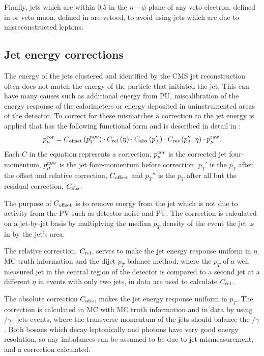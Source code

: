 Finally, jets which are within 0.5 in the $\eta-\phi$ plane of any veto electron, defined in  or veto muon, defined in  are vetoed, to avoid using jets which are due to misreconstructed leptons.

\subsection{Jet energy corrections}
\label{sec:jec}
The energy of the jets clustered and identified by the CMS jet reconstruction often does not match the energy of the particle that initiated the jet. This can have many causes such as additional energy from \ac{PU}, miscalibration of the energy response of the calorimeters or energy deposited in uninstrumented areas of the detector. To correct for these mismatches a correction to the jet energy is applied that has the following functional form and is described in detail in : 
\begin{equation}
  p_{\mu}^{\rm{cor}}=C_{\rm{offset}}\left(p_{T}^{\rm{raw}}\right)\cdot C_{\rm{rel}}\left(\eta\right)\cdot C_{\rm{abs}}\left(p_{T}'\right)\cdot C_{\rm{res}}\left(p_{T}'',\eta\right)\cdot p_{\mu}^{\rm{raw}}.
\end{equation}
Each $C$ in the equation represents a correction, $p_{\mu}^{\rm{cor}}$ is the corrected jet four-momentum, $p_{\mu}^{\rm{raw}}$ is the jet four-momentum before correction, $p_{T}'$ is the $p_{T}$ after the offset and relative correction, $C_{\rm{offset}}$ and $p_{T}''$ is the $p_{T}$ after all but the residual correction, $C_{\rm{abs}}$.

The purpose of $C_{\rm{offset}}$ is to remove energy from the jet which is not due to activity from the \ac{PV} such as detector noise and \ac{PU}. The correction is calculated on a jet-by-jet basis by multiplying the median $p_{T}$ density of the event the jet is in by the jet's area. 

The relative correction, $C_{\rm{rel}}$, serves to make the jet energy response uniform in $\eta$. \ac{MC} truth information and the dijet $p_{T}$ balance method, where the $p_{T}$ of a well measured jet in the central region of the detector is compared to a second jet at a different $\eta$ in events with only two jets, in data are used to calculate $C_{\rm{rel}}$.

The absolute correction $C_{\rm{abs}}$, makes the jet energy response uniform in $p_{T}$. The correction is calculated in \ac{MC} with \ac{MC} truth information and in data by using \PZ$/\gamma$+jets events, where the transverse momentum of the jets should balance the \PZ$/\gamma$. Both \PZ bosons which decay leptonically and photons have very good energy resolution, so any imbalances can be assumed to be due to jet mismeasurement, and a correction calculated.

